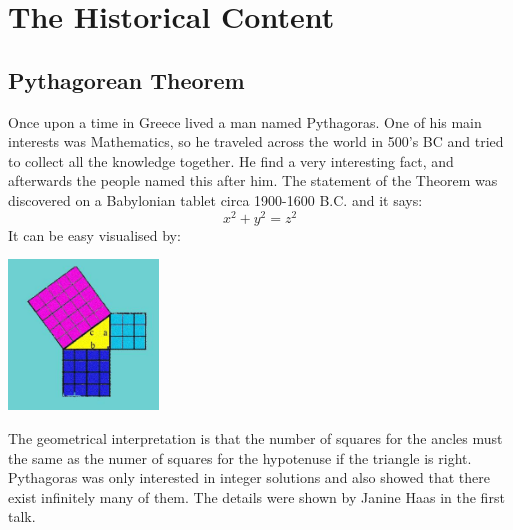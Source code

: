 \documentclass[12pt, a4paper, twoside]{article}
\numberwithin{equation}{section}
\begin{document}
\section{The Historical Content}
\subsection{Pythagorean Theorem}
Once upon a time in Greece lived a man named Pythagoras. One of his main interests was Mathematics, so he traveled across the world in 500's BC and tried to collect all the knowledge together. He find a very interesting fact, and afterwards the people named this after him. The statement of the Theorem was discovered on a Babylonian tablet circa 1900-1600 B.C. and it says:
$$x^2+y^2=z^2$$
It can be easy visualised by:\\
\newline
\begin{center}
\includegraphics[height=4cm]{b.jpg}
\newline
\end{center}
The geometrical interpretation is that the number of squares for the ancles must the same as the numer of squares for the hypotenuse if the triangle is right. Pythagoras was only interested in integer solutions and also showed that there exist infinitely many of them. The details were shown by Janine Haas in the first talk.
\end{document}
